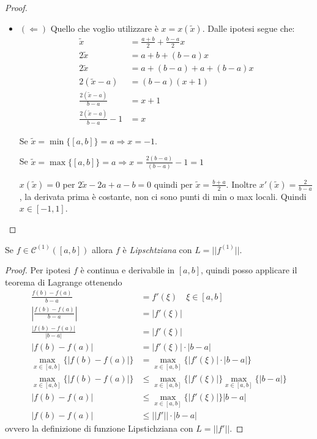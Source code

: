 \begin{proof}
\begin{itemize}
	 \item $(\Leftarrow)$ Quello che voglio utilizzare \`e $x =
	  x(\tilde{x})$. Dalle ipotesi segue che:
	 \begin{displaymath}
	 \begin{split}
	 	\tilde{x} &= \frac{a+b}{2} + \frac{b-a}{2}x \\
	 	2\tilde{x} &= a + b + (b-a) x \\
	 	2\tilde{x} &= a + (b -a) +a +(b-a)x \\
	 	2(\tilde{x} -a) &= (b-a)(x+1) \\
	 	\frac{2(\tilde{x} -a)}{b-a} &= x+1 \\
	 	\frac{2(\tilde{x} -a)}{b-a} -1 &= x
	 \end{split}
	 \end{displaymath}
	 
	 Se $\tilde{x} = \min\{[a,b]\} = a \Rightarrow x = -1$.
	 
	 Se $\tilde{x} = \max\{[a,b]\} = a \Rightarrow x = \frac{2(b-a)}{(b-a)}-1 = 1$
	 
	 $x(\tilde{x}) = 0$ per $2\tilde{x} -2a + a -b = 0$ quindi per $\tilde{x} =
	 \frac{b+a}{2}$. Inoltre $x'(\tilde{x}) = \frac{2}{b-a}$, la derivata prima \`e
	 costante, non ci sono punti di min o max locali. Quindi $x \in [-1,1]$.
	\end{itemize}
\end{proof}

\begin{exercise}
Se $f \in \mathcal{C}^{(1)}([a,b])$ allora $f$ \`e \emph{Lipschtziana} con $L =
||f^{(1)}||$.
\end{exercise}
\begin{proof}
Per ipotesi $f$ \`e continua e derivabile in $[a, b]$, quindi posso applicare il
teorema di Lagrange ottenendo
\begin{displaymath}
\begin{split}
	\frac{f(b) - f(a)}{b-a} &= f'(\xi) \quad \xi \in [a, b] \\
	\left|\frac{f(b) - f(a)}{b-a}\right| &= |f'(\xi)| \\
	\frac{|f(b) - f(a)|}{|b-a|} &= |f'(\xi)| \\
	|f(b) - f(a)| &= |f'(\xi)| \cdot |b-a| \\
	\max_{x\in[a,b]}\{|f(b) - f(a)|\} &= \max_{x\in[a,b]}\{|f'(\xi)| \cdot
	|b-a|\}\\
	\max_{x\in[a,b]}\{|f(b) - f(a)|\} &\leq \max_{x\in[a,b]}\{|f'(\xi)|\}
	\max_{x\in[a,b]}\{|b-a|\}\\ 
	|f(b) - f(a)| &\leq \max_{x\in[a,b]}\{|f'(\xi)|\}  |b-a| \\
	|f(b) - f(a)| &\leq ||f'||\cdot |b-a|
\end{split}
\end{displaymath}
ovvero la definizione di funzione Lipstichziana con $L = ||f'||$.
\end{proof}

